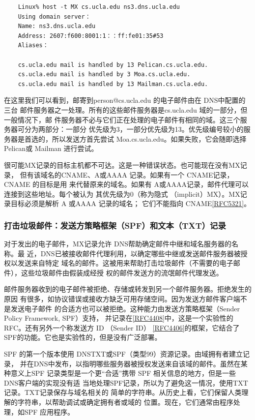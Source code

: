 \begin{verbatim}
    Linux% host -t MX cs.ucla.edu ns3.dns.ucla.edu
    Using domain server：
    Name: ns3.dns.ucla.edu
    Address: 2607:f600:8001:1：：ff:fe01:35#53
    Aliases：

    cs.ucla.edu mail is handled by 13 Pelican.cs.ucla.edu.
    cs.ucla.edu mail is handled by 3 Moa.cs.ucla.edu.
    cs.ucla.edu mail is handled by 13 Mailman.cs.ucla.edu.
\end{verbatim}

在这里我们可以看到，邮寄到person@cs.ucla.edu 的电子邮件由在 DNS中配置的三台
邮件服务器之一处理。所有的这些邮件服务器是cs.ucla.edu 域的一部分，但一般情况下，邮
件服务器不必与它们正在处理的电子邮件有相同的域。这三个服务器可分为两部分：一部分
优先级为3，一部分优先级为13。优先级编号较小的服务器是首选的，所以发送方首先尝试
Moa.cs.ucla.edu。如果失败，它会随即选择 Pelican或 Mailman 进行尝试。

很可能MX记录的目标主机都不可达。这是一种错误状态。也可能现在没有MX记录，
但有该域名的CNAME、A或AAAA 记录。如果有一个 CNAME记录，CNAME 的目标是用
来代替原来的域名。如果有 A或AAAA记录，邮件代理可以连接到这些地址。每个被认为
其优先级为0（称为隐式 （implicit）MX）。MX记录目标必须是解析 A 或AAAA 记录的域名；
它们不能指向 CNAME\href{https://www.rfc-editor.org/rfc/rfc5321}{[RFC5321]}。

\subsubsection{打击垃圾邮件：发送方策略框架（SPF）和文本（TXT）记录}

对于发出的电子邮件，MX记录允许 DNS帮助确定邮件中继和域名服务器的名称。最
近，DNS已被接收邮件代理利用，以确定哪些中继或发送邮件服务器被授权以发送来自特定
域名的邮件。这被用来帮助打击垃圾邮件（不需要的电子邮件），这些垃圾邮件由假装成经授
权的邮件发送方的流氓邮件代理发送。

邮件服务器收到的电子邮件被拒绝、存储或转发到另一个邮件服务器。拒绝发生的原因
有很多，如协议错误或接收方缺乏可用存储空间。因为发送方邮件客户端不是发送电子邮件
的合适方也可以被拒绝。这种能力由发送方策略框架（Sender Policy Framework, SPF）支持，
并记录在\href{https://www.rfc-editor.org/rfc/rfc4408}{[RFC4408]}中，这是一个实验性的 RFC。还有另外一个称发送方 ID （Sender ID）
\href{https://www.rfc-editor.org/rfc/rfc4406}{[RFC4406]}的框架，它结合了 SPF的功能。它也是实验性的，但是没有广泛部署。

SPF 的第一个版本使用 DNSTXT或SPF（类型99）资源记录。由域拥有者建立记录，
并在DNS中发布，以指明哪些服务器被授权发送来自该域的邮件。虽然在某种意义上SPF
记录类型是一个更“合适”携带 SPF 相关信息的地方，但是一些 DNS客户端的实现没有适
当地处理SPF记录，所以为了避免这一情况，使用TXT记录。TXT记录保存与域名相关的
简单的字符串。从历史上看，它们保留人类理解的字符串，以帮助调试或确定拥有者或域的
位置。现在，它们通常由程序处理，如SPF 应用程序。

